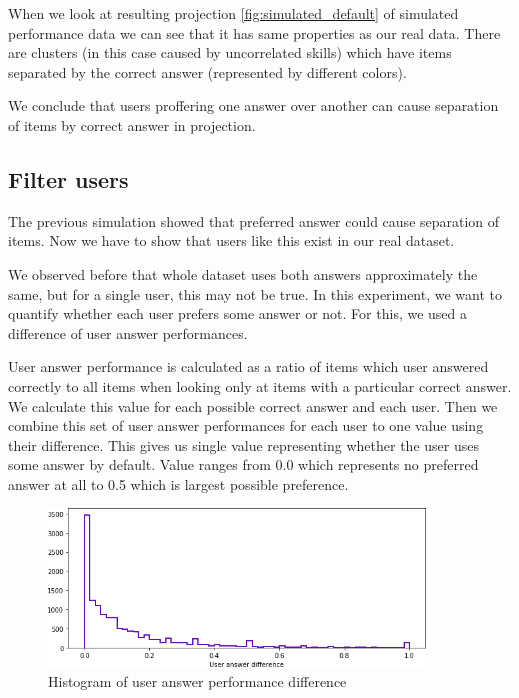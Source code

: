 \documentclass[
  digital, %
  table,   %
  nolof,     %
  nolot,     %
  nocover,
  color,
  final, %
]{fithesis3}
\begin{document}
When we look at resulting projection \ref{fig:simulated_default} of simulated performance data we can see that it has same properties as our real data. There are clusters (in this case caused by uncorrelated skills) which have items separated by the correct answer (represented by different colors).

We conclude that users proffering one answer over another can cause separation of items by correct answer in projection.


\subsection{Filter users}\label{filter-users}


The previous simulation showed that preferred answer could cause separation of items. Now we have to show that users like this exist in our real dataset.

We observed before that whole dataset uses both answers approximately the same, but for a single user, this may not be true. In this experiment, we want to quantify whether each user prefers some answer or not. For this, we used a difference of user answer performances.

User answer performance is calculated as a ratio of items which user answered correctly to all items when looking only at items with a particular correct answer. We calculate this value for each possible correct answer and each user. Then we combine this set of user answer performances for each user to one value using their difference. This gives us single value representing whether the user uses some answer by default. Value ranges from 0.0 which represents no preferred answer at all to 0.5 which is largest possible preference.

\begin{figure}
  \includegraphics[width=10cm]{img/uneven_answers_hist}
  \caption{Histogram of user answer performance difference}
  \label{fig:uneven_answers_hist}
\end{figure}
\end{document}
